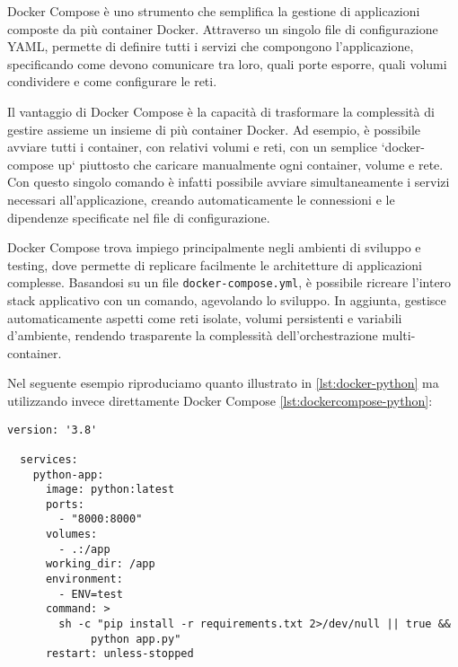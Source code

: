 Docker Compose è uno strumento che semplifica la gestione di applicazioni composte da più container Docker.
Attraverso un singolo file di configurazione YAML, permette di definire tutti i servizi che compongono l'applicazione,
specificando come devono comunicare tra loro, quali porte esporre, quali volumi condividere e come configurare le reti.

Il vantaggio di Docker Compose è la capacità di trasformare la complessità di gestire assieme un insieme di più
container Docker. Ad esempio, è possibile avviare tutti i container, con relativi volumi e reti,
con un semplice `docker-compose up` piuttosto che caricare manualmente ogni container, volume e rete.
Con questo singolo comando è infatti possibile avviare simultaneamente i servizi necessari all'applicazione,
creando automaticamente le connessioni e le dipendenze specificate nel file di configurazione.

Docker Compose trova impiego principalmente negli ambienti di sviluppo e testing, dove permette di replicare
facilmente le architetture di applicazioni complesse. Basandosi su un file \texttt{docker-compose.yml},
è possibile ricreare l'intero stack applicativo con un comando, agevolando lo sviluppo.
In aggiunta, gestisce automaticamente aspetti come reti isolate, volumi persistenti e variabili d'ambiente,
rendendo trasparente la complessità dell'orchestrazione multi-container.

Nel seguente esempio riproduciamo quanto illustrato in \ref{lst:docker-python} ma utilizzando invece direttamente
Docker Compose \ref{lst:dockercompose-python}:

\begin{lstlisting}[caption={Docker Compose Python}, label=lst:dockercompose-python]
  version: '3.8'

  services:
    python-app:
      image: python:latest
      ports:
        - "8000:8000"
      volumes:
        - .:/app
      working_dir: /app
      environment:
        - ENV=test
      command: >
        sh -c "pip install -r requirements.txt 2>/dev/null || true &&
             python app.py"
      restart: unless-stopped
\end{lstlisting}
